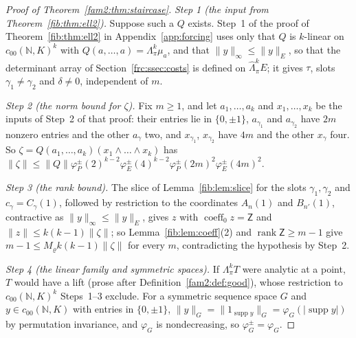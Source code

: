\documentclass[11pt]{amsart}
\theoremstyle{definition}
\theoremstyle{remark}
\numberwithin{equation}{section}
\newcommand{\N}{\mathbb N}
\newcommand{\abs}[1]{\lvert #1\rvert}
\newcommand{\norm}[1]{\lVert #1\rVert}
\newcommand{\coeff}{\operatorname{coeff}}
\newcommand{\rank}{\operatorname{rank}}
\theoremstyle{plain}
\theoremstyle{definition}
\theoremstyle{plain}
\newcommand{\hLambda}{\widehat\Lambda}
\begin{document}
\begin{proof}[Proof of Theorem~\ref{fam2:thm:staircase}]
\emph{Step 1 (the input from Theorem~\ref{fib:thm:ell2}).} Suppose such a $Q$ exists. Step~1 of the proof of
Theorem~\ref{fib:thm:ell2} in Appendix~\ref{app:forcing} uses only that $Q$ is $k$-linear on $c_{00}(\N,K)^k$ with
$Q(a,\dots,a)=\Lambda^k_\pi\mu_a$, and that $\norm y_\infty\le\norm y_E$, so that the determinant array of
Section~\ref{frc:ssec:costs} is defined on $\hLambda^k_\pi E$; it gives $\tau$, slots $\gamma_1\ne\gamma_2$ and $\delta\ne0$,
independent of $m$.

\emph{Step 2 (the norm bound for $\zeta$).} Fix $m\ge1$, and let $a_1,\dots,a_k$ and $x_1,\dots,x_k$ be the inputs of
Step~2 of that proof: their entries lie in $\{0,\pm1\}$, $a_{\gamma_1}$ and $a_{\gamma_2}$ have $2m$ nonzero entries and the
other $a_\gamma$ two, and $x_{\gamma_1}$, $x_{\gamma_2}$ have $4m$ and the other $x_\gamma$ four. So
$\zeta=Q(a_1,\dots,a_k)(x_1\wedge\dots\wedge x_k)$ has
$\norm\zeta\le\norm Q\varphi^\pm_P(2)^{k-2}\varphi^\pm_E(4)^{k-2}\varphi^\pm_P(2m)^2\varphi^\pm_E(4m)^2$.

\emph{Step 3 (the rank bound).} The slice of Lemma~\ref{fib:lem:slice} for the slots $\gamma_1,\gamma_2$ and
$c_\gamma=C_\gamma(1)$, followed by restriction to the coordinates $A_n(1)$ and $B_{n'}(1)$, contractive as
$\norm y_\infty\le\norm y_E$, gives $z$ with $\coeff_0z=\mathsf Z$ and $\norm z\le k(k-1)\norm\zeta$; so
Lemma~\ref{fib:lem:coeff}(2) and $\rank\mathsf Z\ge m-1$ give $m-1\le M_\varrho k(k-1)\norm\zeta$ for every $m$, contradicting
the hypothesis by Step~2.

\emph{Step 4 (the linear family and symmetric spaces).} If $\Lambda^k_\pi T$ were analytic at a point,
$T$ would have a lift (prose after Definition~\ref{fam2:def:good}), whose restriction to $c_{00}(\N,K)^k$ Steps~1--3
exclude. For a symmetric sequence space $G$ and $y\in c_{00}(\N,K)$ with entries
in $\{0,\pm1\}$, $\norm y_G=\norm{1_{\operatorname{supp}y}}_G=\varphi_G(\abs{\operatorname{supp}y})$ by permutation
invariance, and $\varphi_G$ is nondecreasing, so $\varphi^\pm_G=\varphi_G$.
\end{proof}
\end{document}
